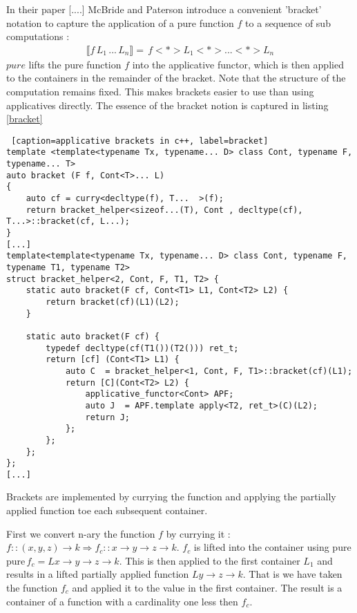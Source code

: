 \documentclass[12pt,fleqn]{article}
\begin{document}
In their paper [....] McBride and Paterson introduce a convenient 'bracket' notation to capture the application of a pure function $f$ 
to a sequence of sub computations :
\begin{eqnarray*}
 \llbracket f\, L_{1}\, ...\, L_{n} \rrbracket  =  \, f <*> L_{1} <*>...<*> L_{n}
\end{eqnarray*}
$pure$ lifts the pure function $f$ into the applicative functor, which is then applied to the containers in the remainder of the bracket. 
Note that the structure of the computation remains fixed.
This makes brackets easier to use than using applicatives directly.
The essence of the bracket notion is captured in listing \ref{bracket}
\begin {lstlisting} [caption=applicative brackets in c++, label=bracket]
template <template<typename Tx, typename... D> class Cont, typename F, typename... T> 
auto bracket (F f, Cont<T>... L) 
{
	auto cf = curry<decltype(f), T...  >(f);	
	return bracket_helper<sizeof...(T), Cont , decltype(cf), T...>::bracket(cf, L...);
} 
[...]
template<template<typename Tx, typename... D> class Cont, typename F, typename T1, typename T2>
struct bracket_helper<2, Cont, F, T1, T2> {
	static auto bracket(F cf, Cont<T1> L1, Cont<T2> L2) {
		return bracket(cf)(L1)(L2);
	}

	static auto bracket(F cf) {
		typedef decltype(cf(T1())(T2())) ret_t;
		return [cf] (Cont<T1> L1) {
			auto C  = bracket_helper<1, Cont, F, T1>::bracket(cf)(L1);
			return [C](Cont<T2> L2) { 
				applicative_functor<Cont> APF;
				auto J  = APF.template apply<T2, ret_t>(C)(L2);
				return J;
			};
		};
	};
};
[...]
\end{lstlisting}
Brackets are implemented by currying the function and applying the partially applied function toe each subsequent container.

First we convert n-ary the function $f$ by currying it : $f::(x,y,z) \rightarrow k \Rightarrow f_c::x \rightarrow y \rightarrow z \rightarrow k$. 
$f_c$ is lifted into the container using pure $ \mbox{pure} \, f_c = L x \rightarrow y \rightarrow z \rightarrow k$. 
This is  then applied to the first container $L_1$ and results in a lifted partially applied function $L y \rightarrow z \rightarrow k$. 
That is we have taken the function $f_c$ and applied it to the value in the first container. The result is a container of a function 
with a cardinality one less then $f_c$.
\end{document}
